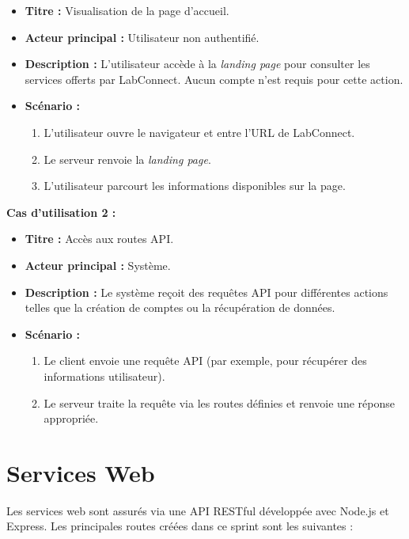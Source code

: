 \documentclass[12pt,a4paper]{report}
\begin{document}
\begin{itemize}
    \item \textbf{Titre :} Visualisation de la page d'accueil.
    \item \textbf{Acteur principal :} Utilisateur non authentifié.
    \item \textbf{Description :} L’utilisateur accède à la \textit{landing page} pour consulter les services offerts par LabConnect. Aucun compte n'est requis pour cette action.
    \item \textbf{Scénario :}
    \begin{enumerate}
        \item L'utilisateur ouvre le navigateur et entre l'URL de LabConnect.
        \item Le serveur renvoie la \textit{landing page}.
        \item L'utilisateur parcourt les informations disponibles sur la page.
    \end{enumerate}
\end{itemize}

\textbf{Cas d’utilisation 2 :}

\begin{itemize}
    \item \textbf{Titre :} Accès aux routes API.
    \item \textbf{Acteur principal :} Système.
    \item \textbf{Description :} Le système reçoit des requêtes API pour différentes actions telles que la création de comptes ou la récupération de données.
    \item \textbf{Scénario :}
    \begin{enumerate}
        \item Le client envoie une requête API (par exemple, pour récupérer des informations utilisateur).
        \item Le serveur traite la requête via les routes définies et renvoie une réponse appropriée.
    \end{enumerate}
\end{itemize}

\section{Services Web}

Les services web sont assurés via une API RESTful développée avec Node.js et Express. Les principales routes créées dans ce sprint sont les suivantes :
\end{document}

